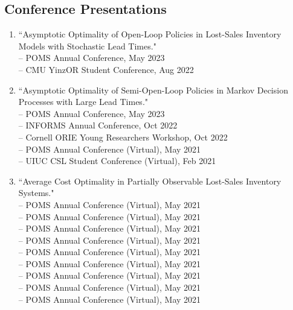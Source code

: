 \documentclass[margin,line]{resume}
\begin{document}
\begin{resume}

 	  \section{\mysidestyle Conference Presentations} 
 	  
 	  \begin{enumerate}[topsep=0pt, leftmargin=*]
        \item``Asymptotic Optimality of Open-Loop Policies in Lost-Sales Inventory Models with Stochastic Lead Times."\\[0.3em]
               -- POMS Annual Conference, \hfill May 2023\\
               -- CMU YinzOR Student Conference,  \hfill Aug 2022\\
               
         \item``Asymptotic Optimality of Semi-Open-Loop Policies in Markov Decision Processes with Large Lead Times."\\[0.3em]
            -- POMS Annual Conference, \hfill May 2023\\
            -- INFORMS Annual Conference,  \hfill Oct 2022\\
            -- Cornell ORIE Young Researchers Workshop, \hfill Oct 2022\\
            -- POMS Annual Conference (Virtual),  \hfill May 2021\\
               -- UIUC CSL Student Conference (Virtual), \hfill Feb 2021\\
                     
               
 	     \item ``Average Cost Optimality in Partially Observable Lost-Sales Inventory Systems."\\[0.3em]
 	           -- POMS Annual Conference (Virtual), \hfill May 2021  \\
              -- POMS Annual Conference (Virtual), \hfill May 2021  \\
               -- POMS Annual Conference (Virtual), \hfill May 2021  \\
                -- POMS Annual Conference (Virtual), \hfill May 2021 \\ 
                 -- POMS Annual Conference (Virtual), \hfill May 2021  \\
             -- POMS Annual Conference (Virtual), \hfill May 2021  \\
             -- POMS Annual Conference (Virtual), \hfill May 2021  \\
             -- POMS Annual Conference (Virtual), \hfill May 2021  \\
             -- POMS Annual Conference (Virtual), \hfill May 2021  \\


\end{enumerate}
\end{resume}
\end{document}
